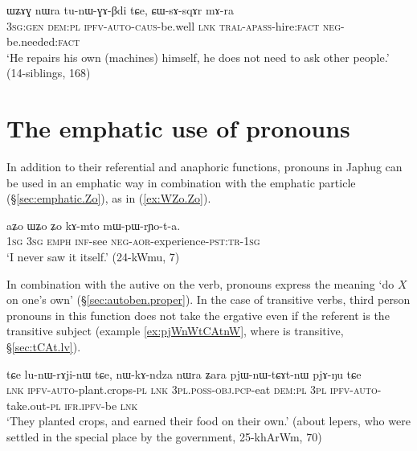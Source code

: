\begin{exe}
\ex \label{ex:WZAG.nWra}
\gll ɯʑɤɣ nɯra tu-nɯ-ɣɤ-βdi tɕe, ɕɯ-sɤ-sqɤr mɤ-ra \\
\textsc{3sg}:\textsc{gen} \textsc{dem}:\textsc{pl} \textsc{ipfv}-\textsc{auto}-\textsc{caus}-be.well \textsc{lnk} \textsc{tral}-\textsc{apass}-hire:\textsc{fact} \textsc{neg}-be.needed:\textsc{fact} \\
\glt `He repairs his own (machines) himself, he does not need to ask other people.' (14-siblings, 168)
\end{exe} 

\section{The emphatic use of pronouns} \label{sec:pronouns.emph}
In addition to their referential and anaphoric functions, pronouns in Japhug can be used in an emphatic way in combination with the emphatic particle  (§\ref{sec:emphatic.Zo}), as in  (\ref{ex:WZo.Zo}).

\begin{exe}
\ex \label{ex:WZo.Zo}
\gll aʑo ɯʑo ʑo kɤ-mto mɯ-pɯ-rɲo-t-a. \\
\textsc{1sg} \textsc{3sg} \textsc{emph} \textsc{inf}-see \textsc{neg}-\textsc{aor}-experience-\textsc{pst}:\textsc{tr}-\textsc{1sg} \\
\glt `I never saw it itself.' (24-kWmu, 7)
\end{exe} 

In combination with the autive  on the verb, pronouns express the meaning `do $X$ on one's own' (§\ref{sec:autoben.proper}). In the case of transitive verbs, third person pronouns in this function does not take the ergative even if the referent is the transitive subject (example \ref{ex:pjWnWtCAtnW}, where  is transitive, §\ref{sec:tCAt.lv}).
 
\begin{exe}
\ex \label{ex:pjWnWtCAtnW}
\gll tɕe lu-nɯ-rɤji-nɯ tɕe, nɯ-kɤ-ndza nɯra ʑara pjɯ-nɯ-tɕɤt-nɯ pjɤ-ŋu tɕe \\
\textsc{lnk} \textsc{ipfv}-\textsc{auto}-plant.crops-\textsc{pl} \textsc{lnk} \textsc{3pl}.\textsc{poss}-\textsc{obj}.\textsc{pcp}-eat \textsc{dem}:\textsc{pl} \textsc{3pl} \textsc{ipfv}-\textsc{auto}-take.out-\textsc{pl} \textsc{ifr}.\textsc{ipfv}-be \textsc{lnk} \\
\glt `They planted crops, and earned their food on their own.' (about lepers, who were settled in the special place by the government, 25-khArWm, 70)
\end{exe} 

